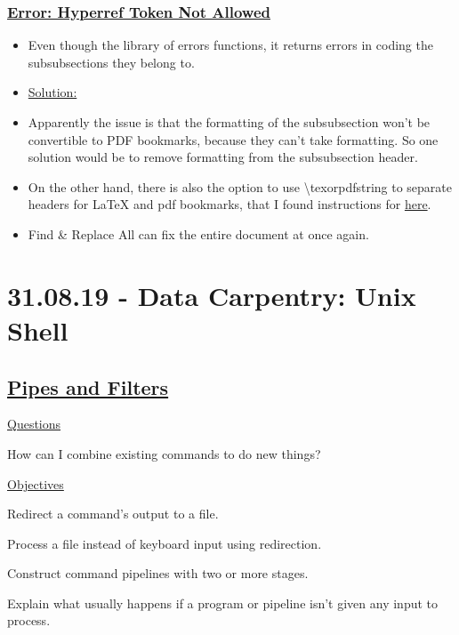\documentclass[12pt]{article}
\begin{document}
\subsubsection{\texorpdfstring{\underline{Error: Hyperref Token Not Allowed}}{}}\label{error:er15}
\begin{itemize}
    \item Even though the library of errors functions, it returns errors in coding the subsubsections they belong to. 
\end{itemize}
\begin{itemize}
\renewcommand{\labelitemi}{}
\item \underline{Solution:}
\renewcommand{\labelitemi}{$\bullet$}
    \item Apparently the issue is that the formatting of the subsubsection won't be convertible to PDF bookmarks, because they can't take formatting. So one solution would be to remove formatting from the subsubsection header.
    \item On the other hand, there is also the option to use \textbackslash texorpdfstring to separate headers for LaTeX and pdf bookmarks, that I found instructions for \href{https://tex.stackexchange.com/questions/53513/hyperref-token-not-allowed}{here}.
    \item Find \& Replace All can fix the entire document at once again.
\end{itemize}

\newpage\section{31.08.19 - Data Carpentry: Unix Shell}
\subsection{\href{http://swcarpentry.github.io/shell-novice/04-pipefilter/index.html}{\textbf{Pipes and Filters}}}

\color{gray}
\underline{Questions}

How can I combine existing commands to do new things?

\underline{Objectives}

Redirect a command’s output to a file.

Process a file instead of keyboard input using redirection.

Construct command pipelines with two or more stages.

Explain what usually happens if a program or pipeline isn’t given any input to process.
\end{document}
